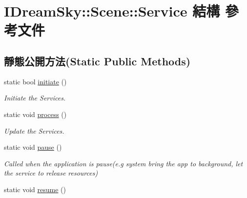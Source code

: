 \hypertarget{struct_i_dream_sky_1_1_scene_1_1_service}{}\section{I\+Dream\+Sky\+:\+:Scene\+:\+:Service 結構 參考文件}
\label{struct_i_dream_sky_1_1_scene_1_1_service}
\subsection*{靜態公開方法(Static Public Methods)}
\begin{DoxyCompactItemize}
\item 
static bool \hyperlink{struct_i_dream_sky_1_1_scene_1_1_service_a8b16ddb2082fdcaa0aa03cd493709f77}{initiate} ()
\begin{DoxyCompactList}\small\item\em Initiate the Services. \end{DoxyCompactList}\item 
static void \hyperlink{struct_i_dream_sky_1_1_scene_1_1_service_af6ad0519436232cd604c72c3e21c5fa3}{process} ()\hypertarget{struct_i_dream_sky_1_1_scene_1_1_service_af6ad0519436232cd604c72c3e21c5fa3}{}\label{struct_i_dream_sky_1_1_scene_1_1_service_af6ad0519436232cd604c72c3e21c5fa3}

\begin{DoxyCompactList}\small\item\em Update the Services. \end{DoxyCompactList}\item 
static void \hyperlink{struct_i_dream_sky_1_1_scene_1_1_service_a214820124ce70577a78978891825a33f}{pause} ()\hypertarget{struct_i_dream_sky_1_1_scene_1_1_service_a214820124ce70577a78978891825a33f}{}\label{struct_i_dream_sky_1_1_scene_1_1_service_a214820124ce70577a78978891825a33f}

\begin{DoxyCompactList}\small\item\em Called when the application is pause(e.\+g system bring the app to background, let the service to release resources) \end{DoxyCompactList}\item 
static void \hyperlink{struct_i_dream_sky_1_1_scene_1_1_service_ab7c2d4600f691aac41b2948b7dfd8fdc}{resume} ()\hypertarget{struct_i_dream_sky_1_1_scene_1_1_service_ab7c2d4600f691aac41b2948b7dfd8fdc}{}\label{struct_i_dream_sky_1_1_scene_1_1_service_ab7c2d4600f691aac41b2948b7dfd8fdc}


\end{DoxyCompactItemize}
